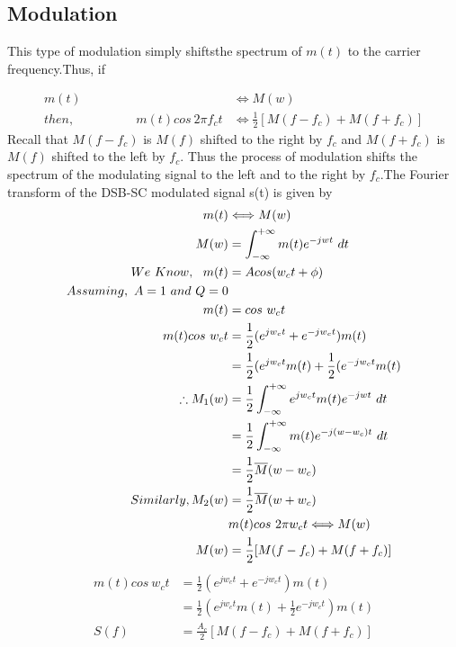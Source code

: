 \subsection{Modulation}
This type of modulation simply shiftsthe spectrum of $m(t)$ to the carrier frequency.Thus, if

\begin{align}
    m(t) &\Longleftrightarrow M(w) \\
    then, ~~~~~~~~~~~~~~~~~~~~~~ m(t)cos~2\pi f_ct & \Longleftrightarrow \frac{1}{2} [ M(f - f_c ) + M(f + f_c )]
\end{align}
Recall that $M(f-f_c)$ is $M(f)$ shifted to the right by $f_c$ and $M(f+f_c)$ is $M(f)$ shifted to the left by $f_c$. Thus the process of modulation shifts the spectrum of the modulating signal to the left and to the right by $f_c$.The Fourier transform of the DSB-SC modulated signal s(t) is given by
\begin{equation}
  \centering
  \begin{split}
    m(t) &\Longleftrightarrow M(w)\\
    M(w) &= \int_{-\infty}^{+\infty} m(t)e^{-jwt} ~dt\\
    We~Know,~~m(t) &= Acos(w_ct + \phi)\\
    Assuming,~A=1 ~and ~Q=0 \\
    m(t) &= cos~w_ct\\
    m(t)cos~w_ct &= \frac{1}{2}(e^{jw_ct} + e^{-jw_ct})m(t)\\
    &= \frac{1}{2}(e^{jw_ct}m(t) + \frac{1}{2}(e^{-jw_ct}m(t)\\
    \therefore M_1(w) &= \frac{1}{2} \int_{-\infty}^{+\infty} e^{jw_ct}m(t)e^{-jwt} ~dt\\
    &= \frac{1}{2} \int_{-\infty}^{+\infty} m(t)e^{-j(w - w_c)t} ~dt\\
    &= \frac{1}{2} \overline{M}(w-w_c)\\
    Similarly, M_2(w) &= \frac{1}{2} \overline{M}(w+w_c)\\
    &m(t)cos~2\pi w_ct \Longleftrightarrow M(w)\\
    M(w) &= \frac{1}{2} [ M(f - f_c ) + M(f + f_c )]\\
  \end{split}
\end{equation}
\begin{align}
  m(t)cos~w_ct &= \frac{1}{2}(e^{jw_ct} + e^{-jw_ct}) m(t)\\
  &= \frac{1}{2}(e^{jw_ct}m(t) + \frac{1}{2}e^{-jw_ct}) m(t)\\
  S(f) &= \frac{A_c}{2} [ M(f - f_c ) + M(f + f_c )]
\end{align}


